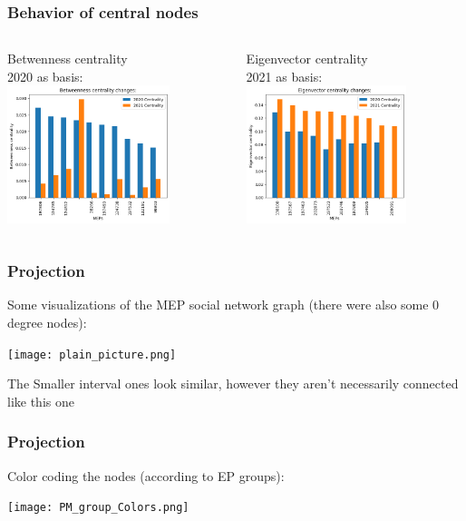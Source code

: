 \documentclass{beamer}
\begin{document}
\begin{frame}
\frametitle{Behavior of central nodes}
\begin{columns}
\column{5cm}
Betwenness centrality \\
2020 as basis:
\includegraphics[height=4cm]{Betweeness_2020asBasis.png}

\pause \column{5cm}
Eigenvector centrality \\
2021 as basis:
\includegraphics[height=4cm]{Eigenvector_2021asBasis.png}

\end{columns}
\end{frame}


\begin{frame}
	\frametitle{Projection}
	Some visualizations of the MEP social network graph (there were also some 0 degree nodes):
	\pause
	\begin{center}
		\texttt{[image: plain\_picture.png]}
	\end{center} 
	\pause 
	{\tiny The Smaller interval ones look similar, however they aren't necessarily connected like this one}
	
	
\end{frame}

\begin{frame}
	\frametitle{Projection}
	Color coding the nodes (according to EP groups):
	\pause
	\begin{center}
		\texttt{[image: PM\_group\_Colors.png]}
	\end{center} 
	
\end{frame}
\end{document}

